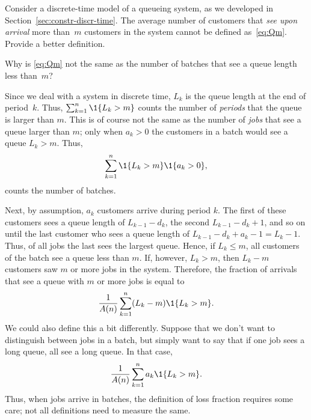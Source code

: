 \begin{exercise}
  Consider a discrete-time model of a queueing system, as we developed
  in Section~\ref{sec:constr-discr-time}.  The average number of customers
  that \emph{see upon arrival} more than~$m$ customers in the system
  cannot be defined as~\eqref{eq:Qm}. Provide a better definition. 
  \begin{hint}
Why is \eqref{eq:Qm} not the same as the number of
  batches that see a queue length less than~$m$?
  \end{hint}
  \begin{solution} Since we deal with a system in discrete time, $L_k$
    is the queue length at the end of period~$k$. Thus,
    $\sum_{k=1}^n \1{L_k > m}$ counts the number of \emph{periods}
    that the queue is larger than $m$. This is of course not the same
    as the number of \emph{jobs} that see a queue larger than $m$;
    only when $a_k>0$ the customers in a batch would see a queue
    $L_k>m$. Thus,
    \begin{equation*}
      \sum_{k=1}^n \1{L_k > m} \1{a_k > 0},
    \end{equation*}
    counts the number of batches. 

    Next, by assumption, $a_k$ customers arrive during period $k$. The
    first of these customers sees a queue length of $L_{k-1} - d_k$,
    the second $L_{k-1}-d_k + 1$, and so on until the last customer
    who sees a queue length of $L_{k-1} - d_k + a_k -1 = L_k
    -1$.
    Thus, of all jobs the last sees the largest queue. Hence, if
    $L_k \leq m$, all customers of the batch see a queue less than
    $m$. If, however, $L_k > m$, then $L_k -m$ customers saw $m$ or
    more jobs in the system. Therefore, the fraction of arrivals that
    see a queue with $m$ or more jobs is equal to
\begin{equation*}
  \frac 1 {A(n)} \sum_{k=1}^n (L_k - m) \1{L_k > m} .
\end{equation*}
We could also define this a bit differently. Suppose that we don't
want to distinguish between jobs in a batch, but simply want to say
that if one job sees a long queue, all see a long queue. In that case,
\begin{equation*}
\frac 1{A(n)}\sum_{k=1}^n a_k \1{L_k > m}.
\end{equation*}
Thus, when jobs arrive in batches, the definition of loss fraction
requires some care; not all definitions need to measure the same.
  \end{solution}
\end{exercise}






  



